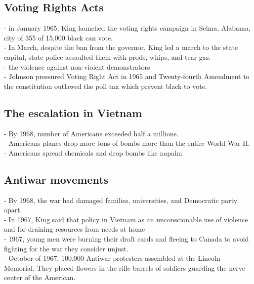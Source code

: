 \documentclass{article}
\begin{document}
\subsection{Voting Rights Acts}
- in January 1965, King launched the voting rights campaign in Selma, Alabama, city of 355 of 15,000 black can vote.\\
- In March, despite the ban from the governor, King led a march to the state capital, state police assaulted them with prods, whips, and tear gas.\\
- the violence against non-violent demonstrators\\
- Johnson pressured Voting Right Act in 1965 and Twenty-fourth Amendment to the constitution outlawed the poll tax which prevent black to vote.

\subsection{The escalation in Vietnam}
- By 1968, number of Americans exceeded half a millions.\\
- Americans planes drop more tons of bombs more than the entire World War II.\\
- Americans spread chemicals and drop bombs like napalm\\

\subsection{Antiwar movements}
- By 1968, the war had damaged families, universities, and Democratic party apart.\\
- In 1967, King said that policy in Vietnam as an unconscionable use of violence and for draining resources from needs at home\\
- 1967, young men were burning their draft cards and fleeing to Canada to avoid fighting for the war they consider unjust.\\
- October of 1967, 100,000 Antiwar protesters assembled at the Lincoln Memorial. They placed flowers in the rifle barrels of soldiers guarding the nerve center of the American. 
\end{document}
